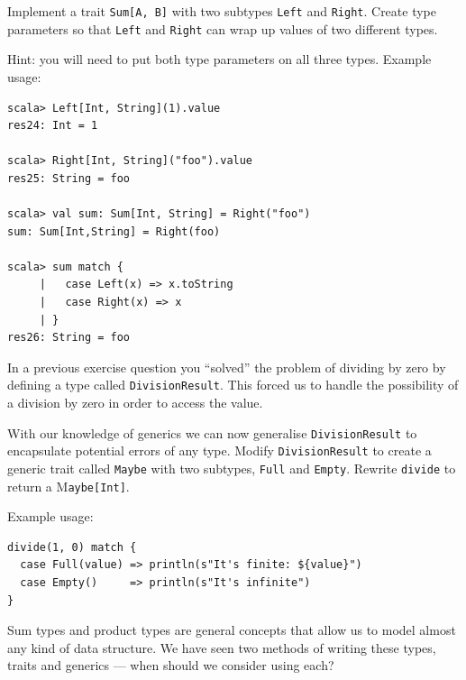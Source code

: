 \documentclass[a4paper,12pt]{exam}
\begin{document}
\begin{questions}

\question
Implement a trait \texttt{Sum[A, B]} with two subtypes \texttt{Left} and \texttt{Right}. 
Create type parameters so that \texttt{Left} and \texttt{Right} can wrap 
up values of two different types.

Hint: you will need to put both type parameters on all three types. Example usage:
\begin{Verbatim}
scala> Left[Int, String](1).value
res24: Int = 1

scala> Right[Int, String]("foo").value
res25: String = foo

scala> val sum: Sum[Int, String] = Right("foo")
sum: Sum[Int,String] = Right(foo)

scala> sum match {
     |   case Left(x) => x.toString
     |   case Right(x) => x
     | }
res26: String = foo
\end{Verbatim}

\question
In a previous exercise question you ``solved'' the problem of dividing by zero by defining a 
type called \texttt{DivisionResult}. This forced us to handle the possibility of a 
division by zero in order to access the value.

With our knowledge of generics we can now generalise \texttt{DivisionResult} to encapsulate 
potential errors of any type. Modify \texttt{DivisionResult} to create 
a generic trait called \texttt{Maybe} with two 
subtypes, \texttt{Full} and \texttt{Empty}. Rewrite \texttt{divide} 
to return a M\texttt{aybe[Int]}. 

\noindent Example usage:
\begin{Verbatim}
divide(1, 0) match {
  case Full(value) => println(s"It's finite: ${value}")
  case Empty()     => println(s"It's infinite")
}
\end{Verbatim}

\question
Sum types and product types are general concepts that allow us to model 
almost any kind of data structure. 
We have seen two methods of writing these types, traits and generics --- 
when should we consider using each?

\end{questions}
\end{document}
